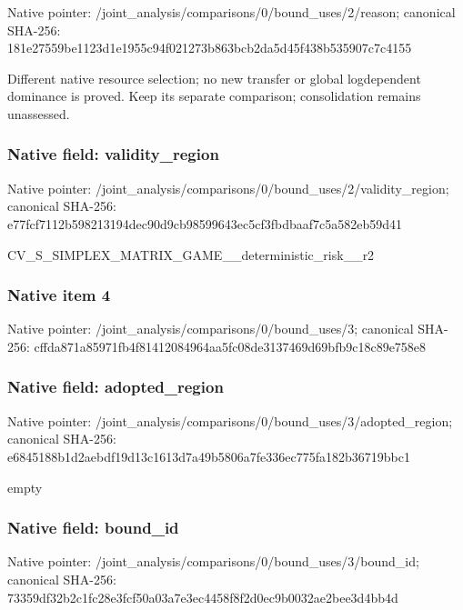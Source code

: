 \documentclass[10pt,a4paper]{article}
\begin{document}
Native pointer: /joint\_analysis/comparis\allowbreak{}ons/0/bound\_uses/2/reaso\allowbreak{}n; canonical SHA-256: 181e27559be1123d1e1955c9\allowbreak{}4f021273b863bcb2da5d45f4\allowbreak{}38b535907c7c4155


Different native resource selection; no new transfer or global logdependent dominance is proved. Keep its separate comparison; consolidation remains unassessed.


\subsubsection{Native field: validity\_region}


Native pointer: /joint\_analysis/comparis\allowbreak{}ons/0/bound\_uses/2/valid\allowbreak{}ity\_region; canonical SHA-256: e77fcf7112b598213194dec9\allowbreak{}0d9cb98599643ec5cf3fbdba\allowbreak{}af7c5a582eb59d41


CV\_S\_SIMPLEX\_MATRIX\_GAME\allowbreak{}\_\_deterministic\_risk\_\_r2


\subsubsection{Native item 4}


Native pointer: /joint\_analysis/comparis\allowbreak{}ons/0/bound\_uses/3; canonical SHA-256: cffda871a85971fb4f814120\allowbreak{}84964aa5fc08de3137469d69\allowbreak{}bfb9c18c89e758e8



\subsubsection{Native field: adopted\_region}


Native pointer: /joint\_analysis/comparis\allowbreak{}ons/0/bound\_uses/3/adopt\allowbreak{}ed\_region; canonical SHA-256: e6845188b1d2aebdf19d13c1\allowbreak{}613d7a49b5806a7fe336ec77\allowbreak{}5fa182b36719bbc1


empty


\subsubsection{Native field: bound\_id}


Native pointer: /joint\_analysis/comparis\allowbreak{}ons/0/bound\_uses/3/bound\allowbreak{}\_id; canonical SHA-256: 73359df32b2c1fc28e3fcf50\allowbreak{}a03a7e3ec4458f8f2d0ec9b0\allowbreak{}032ae2bee3d4bb4d
\end{document}
